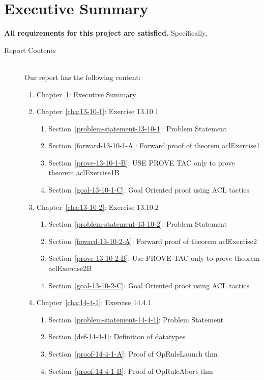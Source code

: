 \documentclass{report}
\begin{document}
\chapter{Executive Summary}
\label{cha:executive-summary}
\textbf{All requirements for this project are satisfied.}
Specifically,
\begin{description}
\item[Report Contents] \ \\
  Our report has the following content:
  \begin{enumerate}[{}]
  \item Chapter~\ref{cha:executive-summary}: Executive Summary
  \item Chapter~\ref{cha:13-10-1}: Exercise 13.10.1
    \begin{enumerate}[{}]
    \item Section~\ref{problem-statement-13-10-1}: Problem Statement
    \item Section~\ref{forward-13-10-1-A}: Forward proof of theorem aclExercise1
    \item Section~\ref{prove-13-10-1-B}: USE PROVE TAC only to prove theorem aclExercise1B
    \item Section~\ref{goal-13-10-1-C}: Goal Oriented proof using ACL tactics
    \end{enumerate}
  \item Chapter~\ref{cha:13-10-2}: Exercise 13.10.2
    \begin{enumerate}[{}]
    \item Section~\ref{problem-statement-13-10-2}: Problem Statement
    \item Section~\ref{foward-13-10-2-A}: Forward proof of theorem aclExercise2
    \item Section~\ref{prove-13-10-2-B}: Use PROVE TAC only to prove theorem aclExercise2B
    \item Section~\ref{goal-13-10-2-C}: Goal Oriented proof using ACL tactics
    \end{enumerate}
  \item Chapter~\ref{cha:14-4-1}: Exercise 14.4.1
    \begin{enumerate}[{}]
    \item Section~\ref{problem-statement-14-4-1}: Problem Statement
    \item Section~\ref{def-14-4-1}: Definition of datatypes
    \item Section~\ref{proof-14-4-1-A}: Proof of OpRuleLaunch thm
    \item Section~\ref{proof-14-4-1-B}: Proof of OpRuleAbort thm

\end{enumerate}
\end{enumerate}
\end{description}
\end{document}
